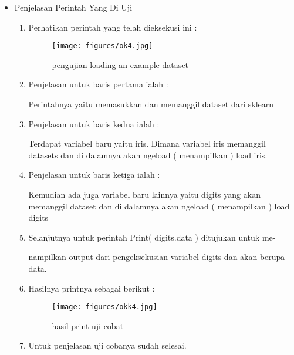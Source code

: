 \begin{enumerate}
\begin{itemize}
\par
\item Penjelasan Perintah Yang Di Uji
\begin{enumerate}
\item Perhatikan perintah yang telah dieksekusi ini :

\par
\begin{figure}[ht]
\centering
\texttt{[image: figures/ok4.jpg]}
\caption{pengujian loading an example dataset}
\label{contoh}
\end{figure}
\par

\item Penjelasan untuk baris pertama ialah :
\par Perintahnya yaitu memasukkan dan memanggil dataset dari sklearn
\par
\par
\item Penjelasan untuk baris kedua ialah :
\par Terdapat variabel baru yaitu iris. Dimana variabel iris memanggil datasets dan di dalamnya akan ngeload ( menampilkan ) load iris.
\par
\item Penjelasan untuk baris ketiga ialah :
\par Kemudian ada juga variabel baru lainnya yaitu digits yang akan memanggil dataset dan di dalamnya akan ngeload ( menampilkan ) load digits
\par
\item Selanjutnya untuk perintah Print( digits.data ) ditujukan untuk me-
\par nampilkan output dari pengeksekusian variabel digits dan akan berupa data.
\par
\item Hasilnya printnya sebagai berikut :
\par

\begin{figure}[ht]
\centering
\texttt{[image: figures/okk4.jpg]}
\caption{hasil print uji cobat}
\label{contoh}
\end{figure}

\par
\item Untuk penjelasan uji cobanya sudah selesai.
\par
\end{enumerate}
\end{itemize}
\end{enumerate} 

